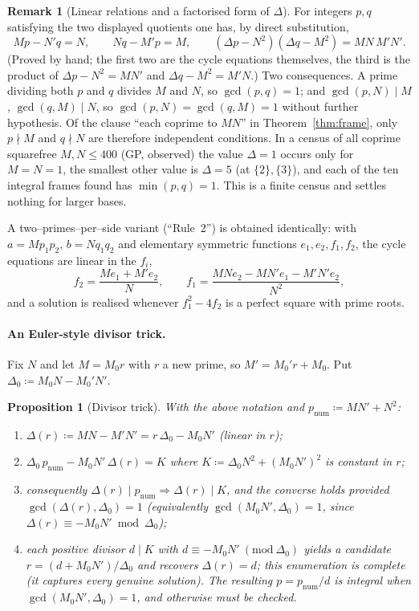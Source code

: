 \documentclass[11pt]{article}
\newtheorem{proposition}[theorem]{Proposition}
\theoremstyle{definition}
\newtheorem{remark}[theorem]{Remark}
\begin{document}
\begin{remark}[Linear relations and a factorised form of $\Delta$]\label{rem:framerelations}
For integers $p,q$ satisfying the two displayed quotients one has, by direct substitution,
\[
Mp-N'q=N,\qquad Nq-M'p=M,\qquad (\Delta p-N^2)(\Delta q-M^2)=MN\,M'N'.
\]
(Proved by hand; the first two are the cycle equations themselves, the third is the product of
$\Delta p-N^2=MN'$ and $\Delta q-M^2=M'N$.) Two consequences. A prime dividing both $p$ and $q$
divides $M$ and $N$, so $\gcd(p,q)=1$; and $\gcd(p,N)\mid M$, $\gcd(q,M)\mid N$, so
$\gcd(p,N)=\gcd(q,M)=1$ without further hypothesis. Of the clause ``each coprime to $MN$'' in
Theorem~\ref{thm:frame}, only $p\nmid M$ and $q\nmid N$ are therefore independent conditions. In a
census of all coprime squarefree $M,N\le 400$ (GP, observed) the value $\Delta=1$ occurs only for
$M=N=1$, the smallest other value is $\Delta=5$ (at $\{2\},\{3\}$), and each of the ten integral
frames found has $\min(p,q)=1$. This is a finite census and settles nothing for larger bases.
\end{remark}

A two--primes--per--side variant (``Rule~2'') is obtained identically: with $a=Mp_1p_2$, $b=Nq_1q_2$
and elementary symmetric functions $e_1,e_2,f_1,f_2$, the cycle equations are linear in the $f_i$,
\[
f_2=\frac{Me_1+M'e_2}{N},\qquad f_1=\frac{MNe_2-MN'e_1-M'N'e_2}{N^2},
\]
and a solution is realised whenever $f_1^2-4f_2$ is a perfect square with prime roots.

\paragraph{An Euler-style divisor trick.}
Fix $N$ and let $M=M_0r$ with $r$ a new prime, so $M'=M_0'r+M_0$. Put
$\Delta_0\coloneqq M_0N-M_0'N'$.

\begin{proposition}[Divisor trick]\label{prop:divisor}
With the above notation and $p_{\mathrm{num}}\coloneqq MN'+N^2$:
\begin{enumerate}[label=\textup{(\alph*)},leftmargin=2.2em]
\item $\Delta(r)\coloneqq MN-M'N'=r\,\Delta_0-M_0N'$ \emph{(linear in $r$)};
\item $\Delta_0\,p_{\mathrm{num}}-M_0N'\,\Delta(r)=K$ where $K\coloneqq \Delta_0N^2+(M_0N')^2$ is
\emph{constant in $r$};
\item consequently $\Delta(r)\mid p_{\mathrm{num}}\Rightarrow \Delta(r)\mid K$, and the converse
holds provided $\gcd(\Delta(r),\Delta_0)=1$ \textup{(}equivalently $\gcd(M_0N',\Delta_0)=1$, since
$\Delta(r)\equiv-M_0N'\bmod\Delta_0$\textup{)};
\item each positive divisor $d\mid K$ with $d\equiv-M_0N'\ (\mathrm{mod}\ \Delta_0)$ yields a
candidate $r=(d+M_0N')/\Delta_0$ and recovers $\Delta(r)=d$; this enumeration is complete (it
captures every genuine solution). The resulting $p=p_{\mathrm{num}}/d$ is integral when
$\gcd(M_0N',\Delta_0)=1$, and otherwise must be checked.
\end{enumerate}
\end{proposition}
\end{document}
